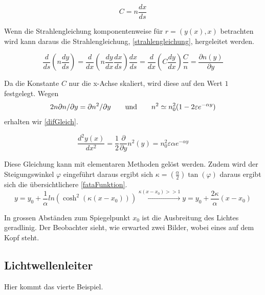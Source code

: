 \begin{equation}
	C = n \frac{dx}{ds}
	\label{lichtge}
\end{equation}

Wenn die Strahlengleichung komponentenweise für $r = (y(x), x)$ betrachten wird kann daraus die Strahlengleichung, \eqref{strahlengleichung}, hergeleitet werden.

\begin{equation}
\frac{d}{ds} \left ( n \frac{dy}{ds} \right ) = \frac{d}{dx} \left ( n \frac{dy}{dx} \frac{dx}{ds} \right ) \frac{dx}{ds} =
\frac{d}{dx} \left ( C \frac{dy}{dx} \right ) \frac{C}{n} = \frac{\partial n(y)}{\partial y}
\label{strahlengleichung}
\end{equation}

Da die Konstante $C$ nur die x-Achse skaliert, wird diese auf den Wert $1$ festgelegt.
Wegen 
\begin{equation}
	2 n \partial n / \partial y = \partial n^2 / \partial y \qquad \text{und} \qquad n^2 \simeq n_0^2(1 - 2 \varepsilon e^{-\alpha y}) \notag
\end{equation}erhalten wir \eqref{difGleich}.

\begin{equation}
	\frac{d^2 y(x)}{dx^2} = \frac{1}{2} \frac{\partial}{\partial y} n^2(y) = n_0^2 \varepsilon \alpha e^{-\alpha y}
	\label{difGleich}
\end{equation}

Diese Gleichung kann mit elementaren Methoden gelöst werden. 
Zudem wird der Steigungswinkel $\varphi$ eingeführt daraus ergibt sich
$\kappa = (\frac{\alpha}{2}) \tan(\varphi)$ daraus ergibt sich die übersichtlichere \eqref{fataFunktion}.
\begin{equation}
	y = y_0 + \frac{1}{\alpha} ln(\cosh^2(\kappa(x - x_0))) \xrightarrow{\kappa (x - x_0 ) >> 1} y =	y_0 + \frac{2 \kappa}{\alpha} (x - x_0)
	\label{fataFunktion}
\end{equation}


In grossen Abständen zum Spiegelpunkt $x_0$ ist die Ausbreitung des Lichtes geradlinig.
Der Beobachter sieht, wie erwarted zwei Bilder, wobei eines auf dem Kopf steht.

\subsection{Lichtwellenleiter}

Hier kommt das vierte Beispiel.
